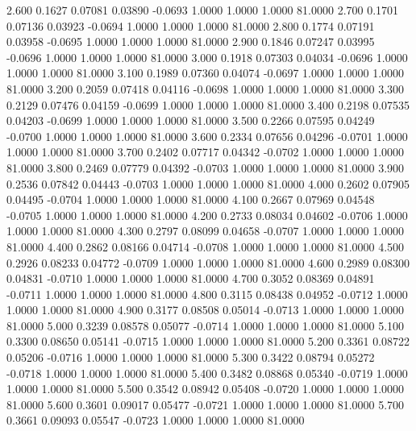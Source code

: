    2.600   0.1627   0.07081   0.03890  -0.0693   1.0000   1.0000   1.0000  81.0000
   2.700   0.1701   0.07136   0.03923  -0.0694   1.0000   1.0000   1.0000  81.0000
   2.800   0.1774   0.07191   0.03958  -0.0695   1.0000   1.0000   1.0000  81.0000
   2.900   0.1846   0.07247   0.03995  -0.0696   1.0000   1.0000   1.0000  81.0000
   3.000   0.1918   0.07303   0.04034  -0.0696   1.0000   1.0000   1.0000  81.0000
   3.100   0.1989   0.07360   0.04074  -0.0697   1.0000   1.0000   1.0000  81.0000
   3.200   0.2059   0.07418   0.04116  -0.0698   1.0000   1.0000   1.0000  81.0000
   3.300   0.2129   0.07476   0.04159  -0.0699   1.0000   1.0000   1.0000  81.0000
   3.400   0.2198   0.07535   0.04203  -0.0699   1.0000   1.0000   1.0000  81.0000
   3.500   0.2266   0.07595   0.04249  -0.0700   1.0000   1.0000   1.0000  81.0000
   3.600   0.2334   0.07656   0.04296  -0.0701   1.0000   1.0000   1.0000  81.0000
   3.700   0.2402   0.07717   0.04342  -0.0702   1.0000   1.0000   1.0000  81.0000
   3.800   0.2469   0.07779   0.04392  -0.0703   1.0000   1.0000   1.0000  81.0000
   3.900   0.2536   0.07842   0.04443  -0.0703   1.0000   1.0000   1.0000  81.0000
   4.000   0.2602   0.07905   0.04495  -0.0704   1.0000   1.0000   1.0000  81.0000
   4.100   0.2667   0.07969   0.04548  -0.0705   1.0000   1.0000   1.0000  81.0000
   4.200   0.2733   0.08034   0.04602  -0.0706   1.0000   1.0000   1.0000  81.0000
   4.300   0.2797   0.08099   0.04658  -0.0707   1.0000   1.0000   1.0000  81.0000
   4.400   0.2862   0.08166   0.04714  -0.0708   1.0000   1.0000   1.0000  81.0000
   4.500   0.2926   0.08233   0.04772  -0.0709   1.0000   1.0000   1.0000  81.0000
   4.600   0.2989   0.08300   0.04831  -0.0710   1.0000   1.0000   1.0000  81.0000
   4.700   0.3052   0.08369   0.04891  -0.0711   1.0000   1.0000   1.0000  81.0000
   4.800   0.3115   0.08438   0.04952  -0.0712   1.0000   1.0000   1.0000  81.0000
   4.900   0.3177   0.08508   0.05014  -0.0713   1.0000   1.0000   1.0000  81.0000
   5.000   0.3239   0.08578   0.05077  -0.0714   1.0000   1.0000   1.0000  81.0000
   5.100   0.3300   0.08650   0.05141  -0.0715   1.0000   1.0000   1.0000  81.0000
   5.200   0.3361   0.08722   0.05206  -0.0716   1.0000   1.0000   1.0000  81.0000
   5.300   0.3422   0.08794   0.05272  -0.0718   1.0000   1.0000   1.0000  81.0000
   5.400   0.3482   0.08868   0.05340  -0.0719   1.0000   1.0000   1.0000  81.0000
   5.500   0.3542   0.08942   0.05408  -0.0720   1.0000   1.0000   1.0000  81.0000
   5.600   0.3601   0.09017   0.05477  -0.0721   1.0000   1.0000   1.0000  81.0000
   5.700   0.3661   0.09093   0.05547  -0.0723   1.0000   1.0000   1.0000  81.0000
